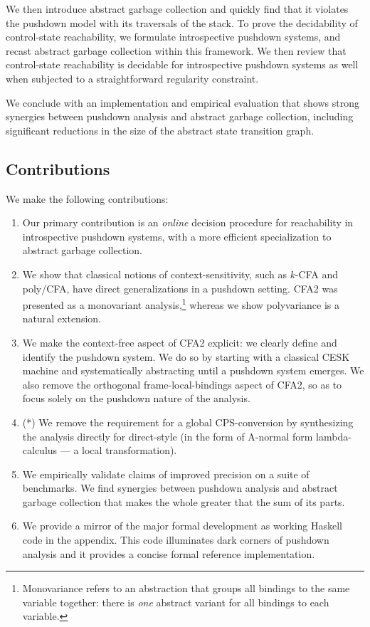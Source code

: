 We then introduce abstract garbage collection and quickly find
that it violates the pushdown model
with its traversals of the stack.
To prove the decidability of control-state reachability,
we formulate introspective pushdown systems, and 
recast abstract garbage collection within this framework.
We then review that control-state reachability is decidable for
introspective pushdown systems as well when
subjected to a straightforward regularity constraint.

We conclude with an implementation and empirical evaluation that shows strong
synergies between pushdown analysis and abstract garbage collection, including
significant reductions in the size of the abstract state transition graph.

\subsection{Contributions}
We make the following contributions:
\begin{enumerate}
\item Our primary contribution is an \emph{online} decision procedure
  for reachability in introspective pushdown systems, with a more
  efficient specialization to abstract garbage collection.


\item We show that classical notions of context-sensitivity, such as
  $k$-CFA and poly/CFA, have direct generalizations in a pushdown
  setting.  CFA2 was presented as a monovariant
  analysis,\footnote{Monovariance refers to an abstraction that groups
    all bindings to the same variable together: there is \emph{one}
    abstract variant for all bindings to each variable.} whereas we
  show polyvariance is a natural extension.

\item We make the context-free aspect of CFA2 explicit: we clearly define and
identify the pushdown system.
We do so by starting with a classical CESK machine and systematically
abstracting until a pushdown system emerges.
We also remove the orthogonal frame-local-bindings aspect of CFA2, so as to
focus solely on the pushdown nature of the analysis.


\item (*) We remove the requirement for a global CPS-conversion
by synthesizing the analysis directly for direct-style (in
    the form of A-normal form lambda-calculus --- a local transformation).


\item We empirically validate claims of improved
precision on a suite of benchmarks.
We find synergies between 
pushdown analysis 
and
abstract garbage collection 
that makes the whole greater that the sum of its parts.

\item
We provide a mirror of the major formal development as working 
Haskell code in the appendix.  
This code illuminates dark corners
of pushdown analysis and it 
provides a concise formal reference implementation.


\end{enumerate}

